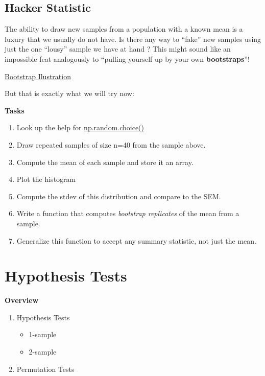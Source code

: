 \documentclass[
  letterpaper,
  DIV=11,
  numbers=noendperiod]{scrreprt}
\providecommand{\tightlist}{%
  \setlength{\itemsep}{0pt}\setlength{\parskip}{0pt}}\usepackage{longtable,booktabs,array}
\begin{document}
\hypertarget{hacker-statistic}{%
\section{Hacker Statistic}\label{hacker-statistic}}

The ability to draw new samples from a population with a known mean is a
luxury that we usually do not have. Is there any way to ``fake'' new
samples using just the one ``lousy'' sample we have at hand ? This might
sound like an impossible feat analogously to ``pulling yourself up by
your own \textbf{bootstraps}''!

\href{https://github.com/markusloecher/DataScience-HWR/blob/main/figures/DC_bootstrap_animated.gif}{Bootstrap
Ilustration}

But that is exactly what we will try now:

\textbf{Tasks}

\begin{enumerate}
\def\labelenumi{\arabic{enumi}.}
\tightlist
\item
  Look up the help for
  \href{https://docs.scipy.org/doc/numpy15.0/reference/generated/numpy.random.choice.html}{np.random.choice()}
\item
  Draw repeated samples of size n=40 from the sample above.
\item
  Compute the mean of each sample and store it an array.
\item
  Plot the histogram
\item
  Compute the stdev of this distribution and compare to the SEM.
\item
  Write a function that computes \emph{bootstrap replicates} of the mean
  from a sample.
\item
  Generalize this function to accept any summary statistic, not just the
  mean.
\end{enumerate}


\hypertarget{hypothesis-tests}{%
\chapter{Hypothesis Tests}\label{hypothesis-tests}}

\textbf{Overview}

\begin{enumerate}
\def\labelenumi{\arabic{enumi}.}
\tightlist
\item
  Hypothesis Tests

  \begin{itemize}
  \tightlist
  \item
    1-sample
  \item
    2-sample
  \end{itemize}
\item
  Permutation Tests
\end{enumerate}
\end{document}
